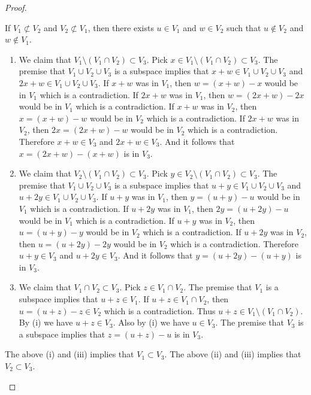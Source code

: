 \begin{proof}
\begin{enumerate}
If $V_1\not\subset V_2$ and $V_2\not\subset V_1$, then there exists $u\in V_1$ and $w\in V_2$ such that $u\notin V_2$ and $w\notin V_1$.
\begin{enumerate}[label=(\roman*)]
\item We claim that $V_1\setminus (V_1\cap V_2)\subset V_3$. Pick $x\in V_1\setminus (V_1\cap V_2)\subset V_3$. The premise that $V_1\cup V_2\cup V_3$ is a subspace implies that $x+w\in V_1\cup V_2\cup V_3$ and $2x+w\in V_1\cup V_2\cup V_3$. If $x+w$ was in $V_1$, then $w=(x+w)-x$ would be in $V_1$ which is a contradiction. If $2x+w$ was in $V_1$, then $w=(2x+w)-2x$ would be in $V_1$ which is a contradiction. If $x+w$ was in $V_2$, then $x=(x+w)-w$ would be in $V_2$ which is a contradiction. If $2x+w$ was in $V_2$, then $2x=(2x+w)-w$ would be in $V_2$ which is a contradiction. Therefore $x+w\in V_3$ and $2x+w\in V_3$. And it follows that $x=(2x+w)-(x+w)$ is in $V_3$.
\item We claim that $V_2\setminus (V_1\cap V_2)\subset V_3$. Pick $y\in V_2\setminus (V_1\cap V_2)\subset V_3$. The premise that $V_1\cup V_2\cup V_3$ is a subspace implies that $u+y\in V_1\cup V_2\cup V_3$ and $u+2y\in V_1\cup V_2\cup V_3$. If $u+y$ was in $V_1$, then $y=(u+y)-u$ would be in $V_1$ which is a contradiction. If $u+2y$ was in $V_1$, then $2y=(u+2y)-u$ would be in $V_1$ which is a contradiction. If $u+y$ was in $V_2$, then $u=(u+y)-y$ would be in $V_2$ which is a contradiction. If $u+2y$ was in $V_2$, then $u=(u+2y)-2y$ would be in $V_2$ which is a contradiction. Therefore $u+y\in V_3$ and $u+2y\in V_3$. And it follows that $y=(u+2y)-(u+y)$ is in $V_3$.
\item We claim that $V_1\cap V_2\subset V_3$.  Pick $z\in V_1\cap V_2$. The premise that $V_1$ is a subspace implies that $u+z\in V_1$. If $u+z\in V_1\cap V_2$, then $u=(u+z)-z\in V_2$ which is a contradiction. Thus $u+z\in V_1\setminus(V_1\cap V_2)$. By (i) we have $u+z\in V_3$. Also by (i) we have $u\in V_3$. The premise that $V_3$ is a subspace implies that $z=(u+z)-u$ is in $V_3$.
\end{enumerate}
The above (i) and (iii) implies that $V_1\subset V_3$. The above (ii) and (iii) implies that $V_2\subset V_3$.
\end{enumerate}
\end{proof}

